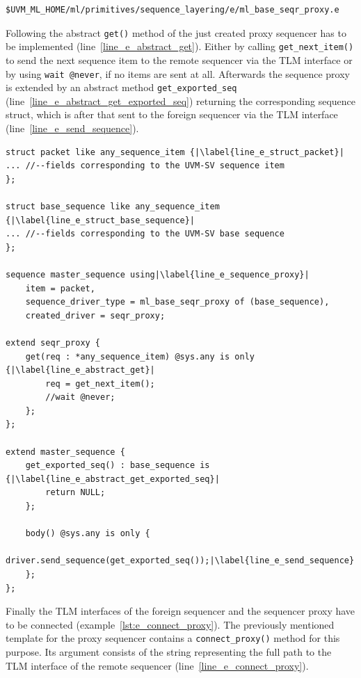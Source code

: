 \smallskip
\begin{lstlisting}
$UVM_ML_HOME/ml/primitives/sequence_layering/e/ml_base_seqr_proxy.e
\end{lstlisting}
\smallskip
Following the abstract \lstinline$get()$ method of the just created proxy sequencer has to be implemented (line~\ref{line_e_abstract_get}). Either by calling \lstinline$get_next_item()$ to send the next sequence item to the remote sequencer via the TLM interface or by using \lstinline$wait @never$, if no items are sent at all. Afterwards the sequence proxy is extended by an abstract method \lstinline$get_exported_seq$ (line~\ref{line_e_abstract_get_exported_seq}) returning the corresponding sequence struct, which is after that sent to the foreign sequencer via the TLM interface (line~\ref{line_e_send_sequence}).
\lstset{language=e, numbers = left, escapechar=|, breaklines=true}
\begin{lstlisting}[frame=htrbl, caption={\textit{e}: creating a proxy sequencer},
label={lst:e_proxy_sequencer}]
struct packet like any_sequence_item {|\label{line_e_struct_packet}|
... //--fields corresponding to the UVM-SV sequence item
};

struct base_sequence like any_sequence_item {|\label{line_e_struct_base_sequence}|
... //--fields corresponding to the UVM-SV base sequence
};

sequence master_sequence using|\label{line_e_sequence_proxy}|
    item = packet,
    sequence_driver_type = ml_base_seqr_proxy of (base_sequence),
    created_driver = seqr_proxy;

extend seqr_proxy {
    get(req : *any_sequence_item) @sys.any is only {|\label{line_e_abstract_get}|
        req = get_next_item();
        //wait @never;
    };
};

extend master_sequence {
    get_exported_seq() : base_sequence is {|\label{line_e_abstract_get_exported_seq}|
        return NULL;
    };

    body() @sys.any is only {
        driver.send_sequence(get_exported_seq());|\label{line_e_send_sequence}|
    };
};
\end{lstlisting}
Finally the TLM interfaces of the foreign sequencer and the sequencer proxy have to be connected (example~\ref{lst:e_connect_proxy}). The previously mentioned template for the proxy sequencer contains a \lstinline$connect_proxy()$ method for this purpose. Its argument consists of the string representing the full path to the TLM interface of the remote sequencer (line~\ref{line_e_connect_proxy}).
\lstset{language=e, numbers = left, escapechar=|, breaklines=true}
